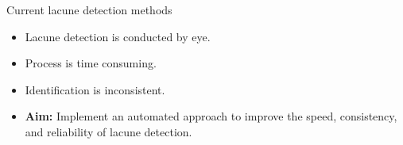 \documentclass{beamer}
\begin{document}
\begin{frame}{Current lacune detection methods}
\begin{itemize}
\setlength\itemsep{1em}
\item Lacune detection is conducted by eye.
\item Process is time consuming.
\item Identification is inconsistent.
\pause
\item \textbf{Aim:} Implement an automated approach to improve the speed, consistency, and reliability of lacune detection.
\end{itemize}
\end{frame}




\end{document}
